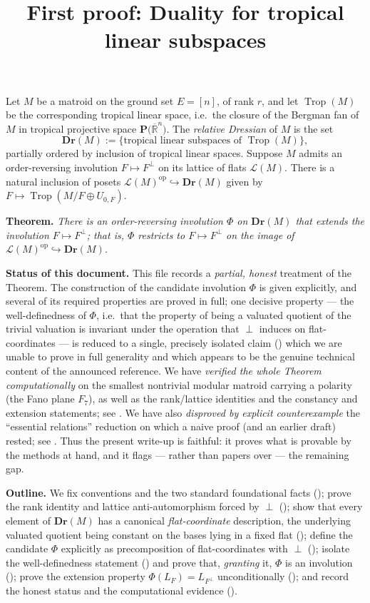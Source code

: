 \documentclass{article}
\title{First proof: Duality for tropical linear subspaces}
\author{}
\date{}
\theoremstyle{definition}
\newcommand{\Rbar}{\overline{\mathbb{R}}}
\newcommand{\Trop}{\operatorname{Trop}}
\newcommand{\op}{\operatorname{op}}
\newcommand{\into}{\hookrightarrow}
\newcommand{\Dr}{\mathbf{Dr}}
\newcommand{\cLL}{\mathcal{L}}
\newcommand{\PT}[1]{\mathbf{P}\big(\Rbar^{#1}\big)}
\begin{document}
\maketitle

\noindent
Let $M$ be a matroid on the ground set $E=[n]$, of rank $r$, and let $\Trop(M)$ be the
corresponding tropical linear space, i.e.\ the closure of the Bergman fan of $M$ in tropical
projective space $\PT{n}$. The \emph{relative Dressian} of $M$ is the set
\[
  \Dr(M):=\{\text{tropical linear subspaces of }\Trop(M)\},
\]
partially ordered by inclusion of tropical linear spaces. Suppose $M$ admits an order-reversing
involution $F\mapsto F^{\perp}$ on its lattice of flats $\cLL(M)$. There is a natural inclusion of
posets $\cLL(M)^{\op}\into\Dr(M)$ given by $F\mapsto\Trop(M/F\oplus U_{0,F})$.

\medskip
\noindent\textbf{Theorem.} \emph{There is an order-reversing involution $\Phi$ on $\Dr(M)$ that
extends the involution $F\mapsto F^{\perp}$; that is, $\Phi$ restricts to $F\mapsto F^{\perp}$ on the
image of $\cLL(M)^{\op}\into\Dr(M)$.}

\medskip
\noindent\textbf{Status of this document.} This file records a \emph{partial, honest} treatment of
the Theorem. The construction of the candidate involution $\Phi$ is given explicitly, and several of
its required properties are proved in full; one decisive property --- the well-definedness of $\Phi$,
i.e.\ that the property of being a valuated quotient of the trivial valuation is invariant under the
operation that $\perp$ induces on flat-coordinates --- is reduced to a single, precisely isolated
claim () which we are unable to prove in full generality and which appears
to be the genuine technical content of the announced reference. We have \emph{verified the whole
Theorem computationally} on the smallest nontrivial modular matroid carrying a polarity (the Fano
plane $F_7$), as well as the rank/lattice identities and the constancy and extension statements; see
. We have also \emph{disproved by explicit counterexample} the
``essential relations'' reduction on which a naive proof (and an earlier draft) rested; see
. Thus the present write-up is faithful: it proves what is provable by the
methods at hand, and it flags --- rather than papers over --- the remaining gap.

\medskip

\noindent\textbf{Outline.} We fix conventions and the two standard foundational facts
(); prove the rank identity and lattice anti-automorphism forced by $\perp$
(); show that every element of $\Dr(M)$ has a canonical \emph{flat-coordinate}
description, the underlying valuated quotient being constant on the bases lying in a fixed flat
(); define the candidate $\Phi$ explicitly as precomposition of flat-coordinates
with $\perp$ (); isolate the well-definedness statement ()
and prove that, \emph{granting} it, $\Phi$ is an involution (); prove the extension
property $\Phi(L_F)=L_{F^{\perp}}$ unconditionally (); and record the honest status
and the computational evidence ().
\end{document}
